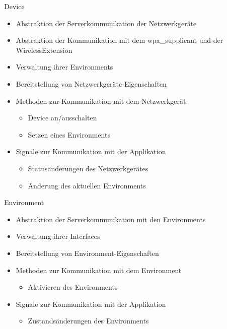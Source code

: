 \begin{frame}[<+-| alert@+>]{Device}
	\begin{itemize}
		\item Abstraktion der Serverkommunikation der Netzwerkgeräte
		\item Abstraktion der Kommunikation mit dem wpa\_supplicant und der WirelessExtension
		\item Verwaltung ihrer Environments
		\item Bereitstellung von Netzwerkgeräte-Eigenschaften
		\item Methoden zur Kommunikation mit dem Netzwerkgerät:
		\begin{itemize}
			\item Device an/ausschalten
			\item Setzen eines Environments
		\end{itemize}
		\item Signale zur Kommunikation mit der Applikation
		\begin{itemize}
			\item Statusänderungen des Netzwerkgerätes
			\item Änderung des aktuellen Environments
		\end{itemize}
	\end{itemize}
\end{frame}

\begin{frame}[<+-| alert@+>]{Environment}
	\begin{itemize}
		\item Abstraktion der Serverkommunikation mit den Environments
		\item Verwaltung ihrer Interfaces
		\item Bereitstellung von Environment-Eigenschaften
		\item Methoden zur Kommunikation mit dem Environment
		\begin{itemize}
			\item Aktivieren des Environments
		\end{itemize}
		\item Signale zur Kommunikation mit der Applikation
		\begin{itemize}
			\item Zustandsänderungen des Environments
		\end{itemize}
	\end{itemize}
\end{frame}

